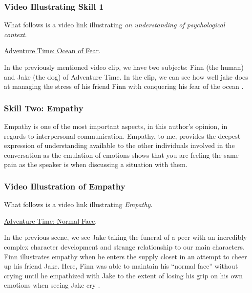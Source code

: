 \documentclass[stu,12pt]{apa7}
\begin{document}
        \subsubsection*{Video Illustrating Skill 1}
          What follows is a video link illustrating \textit{an understanding
            of psychological context}.

          \href{https://www.youtube.com/watch?v=cSSB4qPrfOg}{Adventure Time: %
            Ocean of Fear}.

          In the previously mentioned video clip, we have two subjects: Finn
            (the human) and Jake (the dog) of Adventure Time. In the clip, we
            can see how well jake does at managing the stress of his friend
            Finn with conquering his fear of the ocean
            \parencite[00:00:30--00:01:00]{leichliter_adventure_2017}.


      \subsubsection{Skill Two: Empathy}
        Empathy is one of the most important aspects, in this author's opinion,
          in regards to interpersonal communication. Empathy, to me, provides
          the deepest expression of understanding available to the other
          individuals involved in the conversation as the emulation of emotions
          shows that you are feeling the same pain as the speaker is when
          discussing a situation with them.

        \subsubsection*{Video Illustration of Empathy}
          What follows is a video link illustrating \textit{Empathy}.

          \href{https://www.youtube.com/watch?v=AuD_VzYku78}{Adventure Time:
            Normal Face}.

          In the previous scene, we see Jake taking the funeral of a peer with
            an incredibly complex character development and strange relationship
            to our main characters. Finn illustrates empathy when he enters the
            supply closet in an attempt to cheer up his friend Jake. Here,
            Finn was able to maintain his ``normal face'' without crying until
            he empathized with Jake to the extent of losing his grip on his own
            emotions when seeing Jake cry
            \parencite{leichliter_adventure_2015}.
\end{document}
